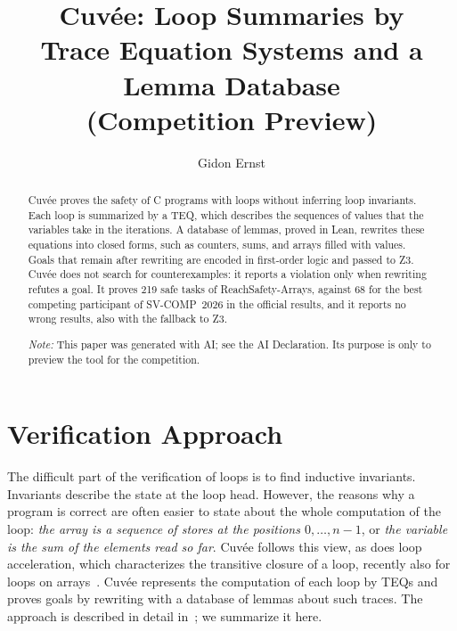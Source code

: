 \documentclass[runningheads]{llncs}
\newcommand{\cuvee}{Cuvée}
\begin{document}
\title{Cuvée: Loop Summaries by\\ Trace Equation Systems and a Lemma Database\\ (Competition Preview)}

\author{Gidon Ernst}

\maketitle

\begin{abstract}
\cuvee{} proves the safety of C programs with loops without inferring loop invariants.
Each loop is summarized by a \ac{TEQ}, which describes the sequences of values that
the variables take in the iterations. A database of lemmas, proved in Lean, rewrites these equations into closed forms, such as counters, sums, and arrays filled with values.
Goals that remain after rewriting are encoded in first-order logic and passed to Z3.
\cuvee{} does not search for counterexamples: it reports a violation only when rewriting refutes a goal.
It proves 219 safe tasks of ReachSafety-Arrays, against 68 for the best competing participant of
SV-COMP~2026 in the official results, and it reports no wrong results, also with the fallback to Z3.

\emph{Note:} This paper was generated with AI; see the AI Declaration. Its purpose is only to preview
the tool for the competition.
\end{abstract}
\acresetall

\section{Verification Approach}

The difficult part of the verification of loops is to find inductive invariants. Invariants describe the
state at the loop head. However, the reasons why a program is correct are often easier to state about the
whole computation of the loop: \emph{the array is a sequence of stores at the positions $0, \dots, n-1$}, or
\emph{the variable is the sum of the elements read so far}. \cuvee{} follows this view, as does loop
acceleration, which characterizes the transitive closure of a loop, recently also for loops on
arrays~\cite{frohn-arrays}. \cuvee{} represents the
computation of each loop by \acp{TEQ} and proves goals by rewriting with a database of lemmas
about such traces. The approach is described in detail in~\cite{teq}; we summarize it here.
\end{document}

